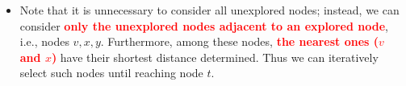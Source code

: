 \documentclass[mathserif]{beamer}
\begin{document}
{\begin{itemize}
\begin{figure}
 
\end{figure}


		\item Note that it is unnecessary to consider all unexplored nodes; instead, we can consider \textcolor{red}{\bf only the unexplored nodes adjacent to an explored node}, i.e., nodes $v, x, y$. Furthermore, among these nodes, \textcolor{red}{\bf the nearest ones ($v$ and $x$)} have their shortest distance determined. Thus we can iteratively select such nodes until reaching node $t$. 

	\end{itemize}
}
\end{document}
